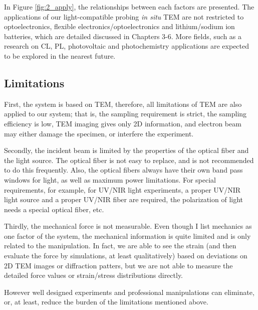 In Figure \ref{fig:2_apply}, the relationships between each factors are presented. The applications of our light-compatible probing {\em in situ} TEM are not restricted to optoelectronics, flexible electronics/optoelectronics and lithium/sodium ion batteries, which are detailed discussed in Chapters 3-6. More fields, such as a research on CL, PL, photovoltaic and photochemistry applications are expected to be explored in the nearest future. 

\subsection{Limitations}
First, the system is based on TEM, therefore, all limitations of TEM are also applied to our system; that is, the sampling requirement is strict, the sampling efficiency is low, TEM imaging gives only 2D information, and electron beam may either damage the specimen, or interfere the experiment. 

Secondly, the incident beam is limited by the properties of the optical fiber and the light source. The optical fiber is not easy to replace, and is not recommended to do this frequently. 
Also, the optical fibers always have their own band pass windows for light, as well as maximum power limitations. 
For special requirements, for example, for UV/NIR light experiments, a proper UV/NIR light source and a proper UV/NIR fiber are required, the polarization of light needs a special optical fiber, etc. 

Thirdly, the mechanical force is not measurable. Even though I list mechanics as one factor of the system, the mechanical information is quite limited and is only related to the manipulation. In fact, we are able to see the strain (and then evaluate the force by simulations, at least qualitatively) based on deviations on 2D TEM images or diffraction patters, but we are not able to measure the detailed force values or strain/stress distributions directly. 

However well designed experiments and professional manipulations can eliminate, or, at least, reduce the burden of the limitations mentioned above. 
